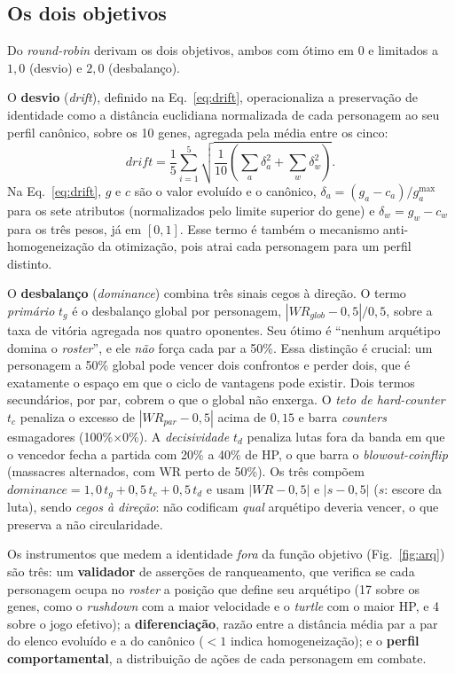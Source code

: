 \documentclass[10pt,conference]{IEEEtran}
\begin{document}
\subsection{Os dois objetivos}

Do \emph{round-robin} derivam os dois objetivos, ambos com ótimo em 0 e limitados a
$1{,}0$ (desvio) e $2{,}0$ (desbalanço).

O \textbf{desvio} (\emph{drift}), definido na Eq.~\eqref{eq:drift}, operacionaliza a
preservação de identidade como a distância euclidiana normalizada de cada personagem
ao seu perfil canônico, sobre os 10 genes, agregada pela média entre os cinco:
\begin{equation}
\label{eq:drift}
\textit{drift} = \frac{1}{5}\sum_{i=1}^{5}
\sqrt{\frac{1}{10}\left(\sum_{a}\delta_{a}^{2} + \sum_{w}\delta_{w}^{2}\right)}.
\end{equation}
Na Eq.~\eqref{eq:drift}, $g$ e $c$ são o valor evoluído e o canônico,
$\delta_{a} = (g_{a}-c_{a})/g_{a}^{\max}$ para os sete atributos (normalizados pelo
limite superior do gene) e $\delta_{w} = g_{w}-c_{w}$ para os três pesos, já em
$[0,1]$. Esse termo é também o mecanismo anti-homogeneização da otimização, pois
atrai cada personagem para um perfil distinto.

O \textbf{desbalanço} (\emph{dominance}) combina três sinais cegos à direção. O
termo \emph{primário} $t_g$ é o desbalanço global por personagem,
$|\textit{WR}_{\textit{glob}}-0{,}5|/0{,}5$, sobre a taxa de vitória agregada nos
quatro oponentes. Seu ótimo é ``nenhum arquétipo domina o \emph{roster}'', e ele
\emph{não} força cada par a 50\%. Essa distinção é crucial: um personagem a 50\%
global pode vencer dois confrontos e perder dois, que é exatamente o espaço em que o
ciclo de vantagens pode existir. Dois termos secundários, por par, cobrem o que o
global não enxerga. O \emph{teto de hard-counter} $t_c$ penaliza o excesso de
$|\textit{WR}_{\textit{par}}-0{,}5|$ acima de $0{,}15$ e barra \emph{counters}
esmagadores (100\%$\times$0\%). A \emph{decisividade} $t_d$ penaliza lutas fora da
banda em que o vencedor fecha a partida com 20\% a 40\% de HP, o que barra o
\emph{blowout-coinflip} (massacres alternados, com WR perto de 50\%). Os três
compõem $\textit{dominance} = 1{,}0\,t_g + 0{,}5\,t_c + 0{,}5\,t_d$ e usam
$|\textit{WR}-0{,}5|$ e $|s-0{,}5|$ ($s$: escore da luta), sendo \emph{cegos à
direção}: não codificam \emph{qual} arquétipo deveria vencer, o que preserva a não
circularidade.

Os instrumentos que medem a identidade \emph{fora} da função objetivo
(Fig.~\ref{fig:arq}) são três: um \textbf{validador} de \valTotal{} asserções de
ranqueamento, que verifica se cada personagem ocupa no \emph{roster} a posição que
define seu arquétipo (17 sobre os genes, como o \emph{rushdown} com a maior
velocidade e o \emph{turtle} com o maior HP, e 4 sobre o jogo efetivo); a
\textbf{diferenciação}, razão entre a distância média par a par do elenco evoluído e
a do canônico ($<1$ indica homogeneização); e o \textbf{perfil comportamental}, a
distribuição de ações de cada personagem em combate.
\end{document}
